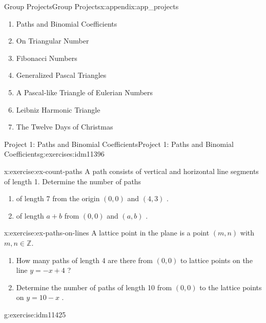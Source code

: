 \documentclass[oneside,10pt,]{book}
\numberwithin{equation}{chapter}
\def\Z{\mathbb Z}
\begin{document}
\begin{appendixptx}{Group Projects}{}{Group Projects}{}{}{x:appendix:app_projects}
\begin{introduction}{}%
%
\begin{enumerate}
\item{}Paths and Binomial Coefficients%
\item{}On Triangular Number%
\item{}Fibonacci Numbers%
\item{}Generalized Pascal Triangles%
\item{}A Pascal-like Triangle of Eulerian Numbers%
\item{}Leibniz Harmonic Triangle%
\item{}The Twelve Days of Christmas%
\end{enumerate}
%
\end{introduction}%
%
%
\typeout{************************************************}
\typeout{************************************************}
%
\begin{exercises-section-numberless}{Project 1: Paths and Binomial Coefficients}{}{Project 1: Paths and Binomial Coefficients}{}{}{g:exercises:idm11396}
\begin{divisionexercise}{1}{}{}{x:exercise:ex-count-paths}%
A path consists of vertical and horizontal line segments of length 1. Determine the number of paths%
\begin{enumerate}[label=(\alph*)]
\item{}of length 7 from the origin \(\left( 0,0 \right)\) and \((4,3)\) .%
\item{}of length \(a + b\) from \(\left( 0,0 \right)\) and \((a,b)\) .%
\end{enumerate}
%
\end{divisionexercise}%
\begin{divisionexercise}{2}{}{}{x:exercise:ex-paths-on-lines}%
A lattice point in the plane is a point \((m,n)\) with \(m,n \in \Z\).%
\begin{enumerate}[label=(\alph*)]
\item{}How many paths of length 4 are there from \((0,0)\) to lattice points on the line \(y = - x + 4\) ?%
\item{}Determine the number of paths of length 10 from \((0,0)\) to the lattice points on \(y = 10 - x\) .%
\end{enumerate}
%
\end{divisionexercise}%
\begin{divisionexercise}{3}{}{}{g:exercise:idm11425}%

\end{divisionexercise}
\end{exercises-section-numberless}
\end{appendixptx}
\end{document}
